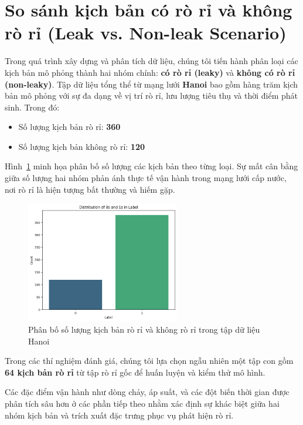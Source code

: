 \section{So sánh kịch bản có rò rỉ và không rò rỉ (Leak vs. Non-leak Scenario)}

Trong quá trình xây dựng và phân tích dữ liệu, chúng tôi tiến hành phân loại các kịch bản mô phỏng thành hai nhóm chính: \textbf{có rò rỉ (leaky)} và \textbf{không có rò rỉ (non-leaky)}. Tập dữ liệu tổng thể từ mạng lưới \textbf{Hanoi} bao gồm hàng trăm kịch bản mô phỏng với sự đa dạng về vị trí rò rỉ, lưu lượng tiêu thụ và thời điểm phát sinh. Trong đó:

\begin{itemize}
    \item Số lượng kịch bản rò rỉ: \textbf{360}
    \item Số lượng kịch bản không rò rỉ: \textbf{120}
\end{itemize}

Hình~\ref{fig:scenario_stats} minh họa phân bố số lượng các kịch bản theo từng loại. Sự mất cân bằng giữa số lượng hai nhóm phản ánh thực tế vận hành trong mạng lưới cấp nước, nơi rò rỉ là hiện tượng bất thường và hiếm gặp.

\begin{figure}[H]
    \centering
    \includegraphics[width=0.6\textwidth]{image/section5_3/scenario_statistics.png}
    \caption{Phân bố số lượng kịch bản rò rỉ và không rò rỉ trong tập dữ liệu Hanoi}
    \label{fig:scenario_stats}
\end{figure}

Trong các thí nghiệm đánh giá, chúng tôi lựa chọn ngẫu nhiên một tập con gồm \textbf{64 kịch bản rò rỉ} từ tập rò rỉ gốc để huấn luyện và kiểm thử mô hình.

Các đặc điểm vận hành như dòng chảy, áp suất, và các đột biến thời gian được phân tích sâu hơn ở các phần tiếp theo nhằm xác định sự khác biệt giữa hai nhóm kịch bản và trích xuất đặc trưng phục vụ phát hiện rò rỉ.

